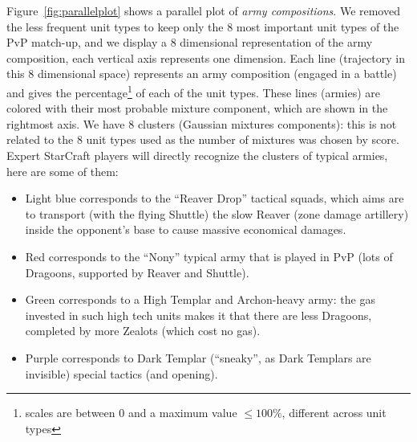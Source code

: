 Figure~\ref{fig:parallelplot} shows a parallel plot of \textit{army compositions}. We removed the less frequent unit types to keep only the 8 most important unit types of the PvP match-up, and we display a 8 dimensional representation of the army composition, each vertical axis represents one dimension. Each line (trajectory in this 8 dimensional space) represents an army composition (engaged in a battle) and gives the percentage\footnote{scales are between 0 and a maximum value $\leq 100\%$, different across unit types} of each of the unit types. These lines (armies) are colored with their most probable mixture component, which are shown in the rightmost axis. We have 8 clusters (Gaussian mixtures components): this is not related to the 8 unit types used as the number of mixtures was chosen by  score. Expert StarCraft players will directly recognize the clusters of typical armies, here are some of them:
\begin{itemize}
    \item Light blue corresponds to the ``Reaver Drop'' tactical squads, which aims are to transport (with the flying Shuttle) the slow Reaver (zone damage artillery) inside the opponent's base to cause massive economical damages.
    \item Red corresponds to the ``Nony'' typical army that is played in PvP (lots of Dragoons, supported by Reaver and Shuttle).
    \item Green corresponds to a High Templar and Archon-heavy army: the gas invested in such high tech units makes it that there are less Dragoons, completed by more Zealots (which cost no gas).
    \item Purple corresponds to Dark Templar (``sneaky'', as Dark Templars are invisible) special tactics (and opening).
\end{itemize}


